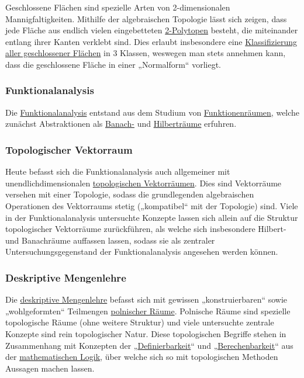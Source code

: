 \documentclass[12pt,]{article}
\begin{document}
Geschlossene Flächen sind spezielle Arten von 2-dimensionalen
Mannigfaltigkeiten. Mithilfe der algebraischen Topologie lässt sich
zeigen, dass jede Fläche aus endlich vielen eingebetteten
\href{Polytop_(Geometrie)}{2-Polytopen} besteht, die miteinander entlang
ihrer Kanten verklebt sind. Dies erlaubt insbesondere eine
\href{Klassifikationssatz_für_2-Mannigfaltigkeiten}{Klassifizierung
aller geschlossener Flächen} in 3 Klassen, weswegen man stets annehmen
kann, dass die geschlossene Fläche in einer „Normalform`` vorliegt.

\subsubsection{Funktionalanalysis}\label{funktionalanalysis}

Die \url{Funktionalanalysis} entstand aus dem Studium von
\href{Funktionenraum}{Funktionenräumen}, welche zunächst Abstraktionen
als \href{Banachraum}{Banach-} und \href{Hilbertraum}{Hilberträume}
erfuhren.

\subsubsection{Topologischer Vektorraum}\label{topologischer-vektorraum}

Heute befasst sich die Funktionalanalysis auch allgemeiner mit
unendlichdimensionalen \href{Topologischer_Vektorraum}{topologischen
Vektorräumen}. Dies sind Vektorräume versehen mit einer Topologie,
sodass die grundlegenden algebraischen Operationen des Vektorraums
stetig („kompatibel`` mit der Topologie) sind. Viele in der
Funktionalanalysis untersuchte Konzepte lassen sich allein auf die
Struktur topologischer Vektorräume zurückführen, als welche sich
insbesondere Hilbert- und Banachräume auffassen lassen, sodass sie als
zentraler Untersuchungsgegenstand der Funktionalanalysis angesehen
werden können.

\subsubsection{Deskriptive Mengenlehre}\label{deskriptive-mengenlehre}

Die \href{deskriptive_Mengenlehre}{deskriptive Mengenlehre} befasst sich
mit gewissen „konstruierbaren`` sowie „wohlgeformten`` Teilmengen
\href{Polnischer_Raum}{polnischer Räume}. Polnische Räume sind spezielle
topologische Räume (ohne weitere Struktur) und viele untersuchte
zentrale Konzepte sind rein topologischer Natur. Diese topologischen
Begriffe stehen in Zusammenhang mit Konzepten der
„\url{Definierbarkeit}`` und „\url{Berechenbarkeit}`` aus der
\href{Mathematische_Logik}{mathematischen Logik}, über welche sich so
mit topologischen Methoden Aussagen machen lassen.
\end{document}
